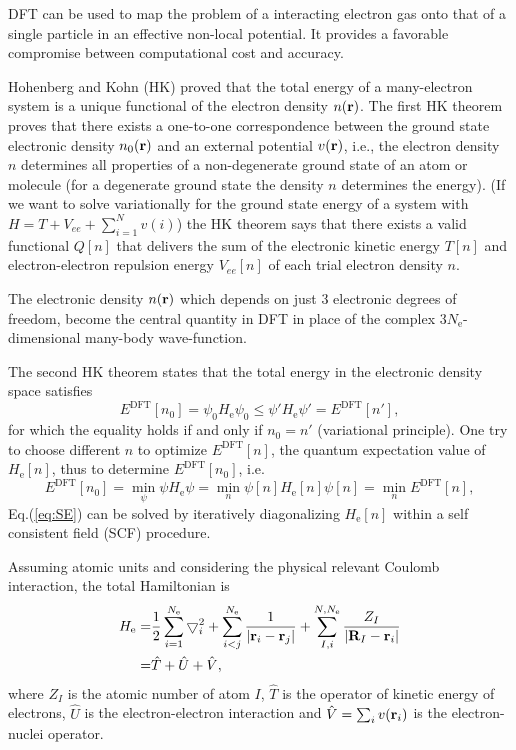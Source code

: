 DFT can be used to map the problem of a interacting electron gas onto that of a single particle in an effective non-local 
potential\cite{MCP92}. It provides a favorable compromise between computational cost and accuracy.

Hohenberg and Kohn (HK) proved that the total energy of a many-electron system is a unique functional of the electron density $n(\bf r)$.
The first HK theorem proves that there exists a one-to-one correspondence between the ground state electronic density $n_0(\bf r)$ 
and an external potential $v(\bf r)$, i.e., the electron density  $n$ determines all
properties of a non-degenerate ground state of an atom or molecule (for a degenerate 
ground state the density $n$ determines the energy).
(If we want to solve variationally for the ground state energy of a system with $H=T + V_{ee}+\sum_{i=1}^N v(i)$) the 
HK theorem says that there exists a valid functional $Q[n]$ that delivers the sum of the electronic kinetic energy $T[n]$ 
and electron-electron repulsion energy $V_{ee}[n]$ of each trial electron density $n$\cite{Levy1979}.

The electronic density $n(\bf r)$ which depends on just 3 electronic degrees of freedom, become the central quantity in DFT 
in place of the complex $3N_{\text{e}}$-dimensional many-body wave-function.

The second HK theorem states that the total energy in the electronic density space satisfies
\begin{equation}
        E^{\text{DFT}}[n_0]= \psi_0  H_{\text{e}} \psi_0 \leq \psi' H_{\text{e}} \psi' =E^{\text{DFT}}[n'],
\label{eq:HK2}
\end{equation}
for which the equality holds if and only if $n_0=n'$ (variational principle).
One try to choose different $n$ to optimize $E^{\text{DFT}}[n]$, the quantum expectation value of $H_{\text{e}}[n]$, thus to determine $E^{\text{DFT}}[n_0]$, i.e.
\begin{equation}
E^{\text{DFT}}[n_0]= \min\limits_{\psi} \psi  H_{\text{e}} \psi  = \min\limits_{n}\psi[n]H_{\text{e}}[n]\psi[n] =\min\limits_{n}E^{\text{DFT}}[n],
\label{eq:var}
\end{equation}
Eq.\thinspace(\ref{eq:SE}) can be solved by iteratively diagonalizing $H_{\text{e}}[n]$ within a self consistent field (SCF) procedure.

Assuming atomic units and considering the physical relevant Coulomb interaction, the total Hamiltonian is 
\begin{align}        
        H_{\text{e}} =& \frac{1}{2}\sum_{i=1}^{N_{\text{e}}}\bigtriangledown_i^2 +\sum_{i<j}^{N_{\text{e}}}\frac{1}{|{\bf r}_i -{\bf r}_j|} +\sum_{I,i}^{N,N_{\text{e}}}\frac{Z_I}{|{\bf R}_I - {\bf r}_i|}   \nonumber \\
        =& {\hat{T}}+{\hat{U}}+{\hat{V}},
\label{eq:H}
\end{align}
where $Z_I$ is the atomic number of atom $I$, ${\hat{T}}$ is the operator of kinetic energy of electrons, ${\hat{U}}$ is the 
electron-electron interaction and  ${\hat{V}}=\sum_i v({\bf r}_i)$ is the electron-nuclei operator.

